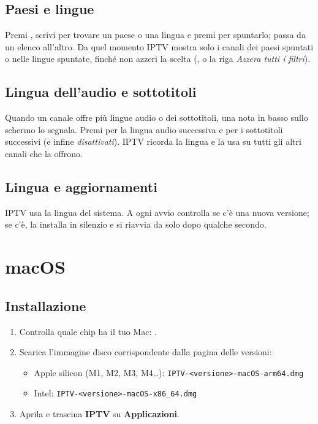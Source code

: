 \subsection{Paesi e lingue}
Premi , scrivi per trovare un paese o una lingua e premi 
per spuntarlo;  passa da un elenco all'altro. Da quel momento IPTV
mostra solo i canali dei paesi spuntati o nelle lingue spuntate, finché non
azzeri la scelta (, o la riga \emph{Azzera tutti i filtri}).

\subsection{Lingua dell'audio e sottotitoli}
Quando un canale offre più lingue audio o dei sottotitoli, una nota in basso
sullo schermo lo segnala. Premi  per la lingua audio successiva e
 per i sottotitoli successivi (e infine \emph{disattivati}). IPTV
ricorda la lingua e la usa su tutti gli altri canali che la offrono.

\subsection{Lingua e aggiornamenti}
IPTV usa la lingua del sistema. A ogni avvio controlla se c'è una nuova
versione; se c'è, la installa in silenzio e si riavvia da solo dopo qualche
secondo.

\section{macOS}

\subsection{Installazione}
\begin{enumerate}
  \item Controlla quale chip ha il tuo Mac: .
  \item Scarica l'immagine disco corrispondente dalla pagina delle versioni:
  \begin{itemize}
    \item Apple silicon (M1, M2, M3, M4\ldots):
          \texttt{IPTV-\textless versione\textgreater-macOS-arm64.dmg}
    \item Intel: \texttt{IPTV-\textless versione\textgreater-macOS-x86\_64.dmg}
  \end{itemize}
  \item Aprila e trascina \textbf{IPTV} su \textbf{Applicazioni}.
\end{enumerate}

